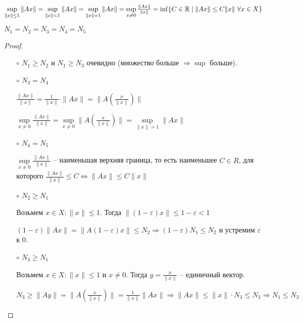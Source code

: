 \begin{theorem}
    $\sup\limits_{\|x\|\leq 1}\|Ax\|= \sup\limits_{\|x\|< 1}\|Ax\|=\sup\limits_{\|x\|=1}\|Ax\|=\sup\limits_{x\neq 0}\frac{\|Ax\|}{\|x\|}=\inf \{C\in \mathbb{R}\mid \|Ax\|\leq C\|x\|\ \forall x\in X\}$

    $N_1=N_2=N_3=N_4=N_5$
\end{theorem}

\begin{proof}
    

\begin{enumerate}
    \item[]

    \item[$\circ$] $N_1\geq N_2$ и $N_1\geq N_3$ очевидно (множество больше $\Rightarrow \sup$ больше).
    
    \item[$\circ$] $N_3=N_4$ 
    
    $\frac{\|Ax\|}{\|x\|}=\frac{1}{\|x\|}\cdot \|Ax\|=\|A(\frac{x}{\|x\|})\|$

    $\sup\limits_{x\neq 0}\frac{\|Ax\|}{\|x\|}=\sup\limits_{x\neq 0}\|A(\frac{x}{\|x\|})\|=\sup\limits_{\|x\|=1}\|Ax\|$

    \item[$\circ$] $N_4=N_5$

    $\sup\limits_{x\neq 0} \frac{\|Ax\|}{\|x\|}$ – наименьшая верхняя граница, то есть наименьшее $C\in R$, для которого $\frac{\|Ax\|}{\|x\|}\leq C\Leftrightarrow \|Ax\|\leq C\|x\|$

    \item[$\circ$] $N_2\geq N_1$

    Возьмем $x\in X: \|x\|\leq 1$.  Тогда $\|(1-\varepsilon)x\|\leq 1-\varepsilon < 1$

    $(1-\varepsilon)\|Ax\|=\|A(1-\varepsilon)x\|\leq N_2\Rightarrow (1-\varepsilon)N_1\leq N_2$ и устремим $\varepsilon$ к 0. 

    \item[$\circ$] $N_3\geq N_1$

    Возьмем $x\in X: \|x\|\leq 1$ и $x\neq 0$. Тогда $y=\frac{x}{\|x\|}$ – единичный вектор. 

    $N_3\geq \|Ay\|=\|A(\frac{x}{\|x\|})\|=\frac{1}{\|x\|}\|Ax\|\Rightarrow \|Ax\|\leq \|x\|\cdot N_3\leq N_3\Rightarrow N_1\leq N_3$
\end{enumerate}
\end{proof}

